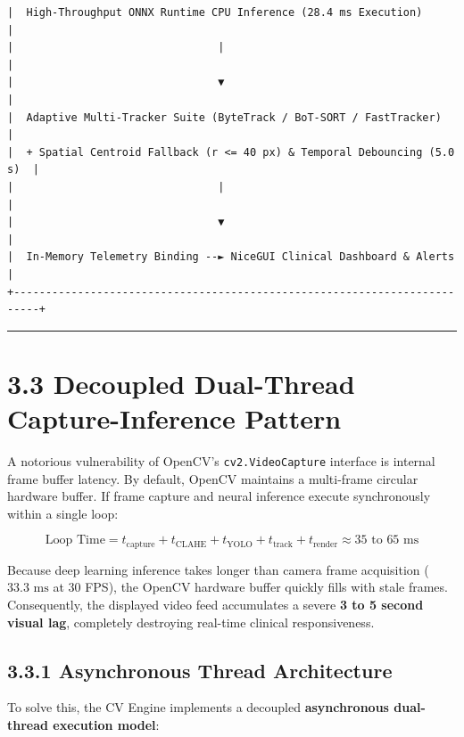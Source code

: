 \begin{verbatim}
|  High-Throughput ONNX Runtime CPU Inference (28.4 ms Execution)          |
|                                |                                         |
|                                ▼                                         |
|  Adaptive Multi-Tracker Suite (ByteTrack / BoT-SORT / FastTracker)       |
|  + Spatial Centroid Fallback (r <= 40 px) & Temporal Debouncing (5.0 s)  |
|                                |                                         |
|                                ▼                                         |
|  In-Memory Telemetry Binding --► NiceGUI Clinical Dashboard & Alerts     |
+--------------------------------------------------------------------------+
\end{verbatim}

\begin{center}\rule{0.5\linewidth}{0.5pt}\end{center}

\section{3.3 Decoupled Dual-Thread Capture-Inference
Pattern}\label{decoupled-dual-thread-capture-inference-pattern}

A notorious vulnerability of OpenCV's \texttt{cv2.VideoCapture}
interface is internal frame buffer latency. By default, OpenCV maintains
a multi-frame circular hardware buffer. If frame capture and neural
inference execute synchronously within a single loop:

\[\text{Loop Time} = t_{\text{capture}} + t_{\text{CLAHE}} + t_{\text{YOLO}} + t_{\text{track}} + t_{\text{render}} \approx 35\text{ to }65\text{ ms}\]

Because deep learning inference takes longer than camera frame
acquisition (\(33.3\text{ ms}\) at 30 FPS), the OpenCV hardware buffer
quickly fills with stale frames. Consequently, the displayed video feed
accumulates a severe \textbf{3 to 5 second visual lag}, completely
destroying real-time clinical responsiveness.

\subsection{3.3.1 Asynchronous Thread
Architecture}\label{asynchronous-thread-architecture}

To solve this, the CV Engine implements a decoupled \textbf{asynchronous
dual-thread execution model}:


